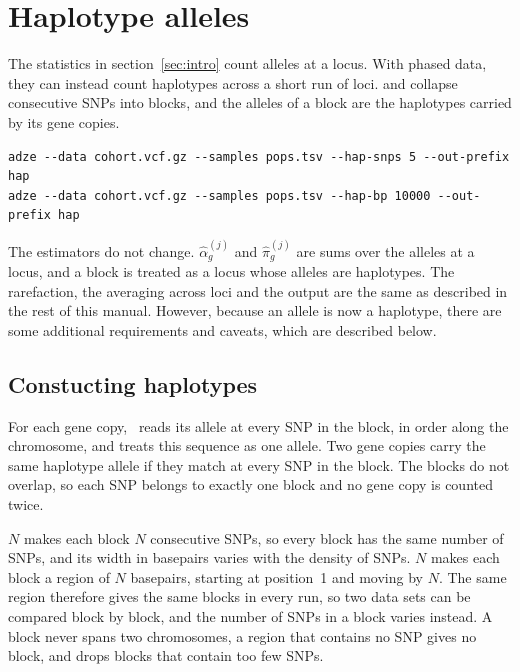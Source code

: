 \section{Haplotype alleles}
\label{sec:haplotypes}

The statistics in section~\ref{sec:intro} count alleles at a locus. With
phased data, they can instead count haplotypes across a short run of loci.
 and  collapse consecutive SNPs into blocks,
and the alleles of a block are the haplotypes carried by its gene copies.

\begin{Verbatim}[frame=single,fontsize=\small]
adze --data cohort.vcf.gz --samples pops.tsv --hap-snps 5 --out-prefix hap
adze --data cohort.vcf.gz --samples pops.tsv --hap-bp 10000 --out-prefix hap
\end{Verbatim}

\noindent The estimators do not change. $\hat{\alpha}_g^{(j)}$ and
$\hat{\pi}_g^{(j)}$ are sums over the alleles at a locus, and a block is
treated as a locus whose alleles are haplotypes. The rarefaction, the
averaging across loci and the output are the same as described in the rest of
this manual. However, because an allele is now a haplotype, there are some
additional requirements and caveats, which are described below.

\subsection{Constucting haplotypes}

For each gene copy, \prog\ reads its allele at every SNP in the block, in order
along the chromosome, and treats this sequence as one allele. Two gene copies
carry the same haplotype allele if they match at every SNP in the block. The
blocks do not overlap, so each SNP belongs to exactly one block and no gene
copy is counted twice.

 $N$ makes each block $N$ consecutive SNPs, so every block has
the same number of SNPs, and its width in basepairs varies with the density of
SNPs.  $N$ makes each block a region of $N$ basepairs, starting
at position~1 and moving by $N$. The same region therefore gives the same
blocks in every run, so two data sets can be compared block by block, and the
number of SNPs in a block varies instead. A block never spans two
chromosomes, a region that contains no SNP gives no block, and
 drops blocks that contain too few SNPs.

